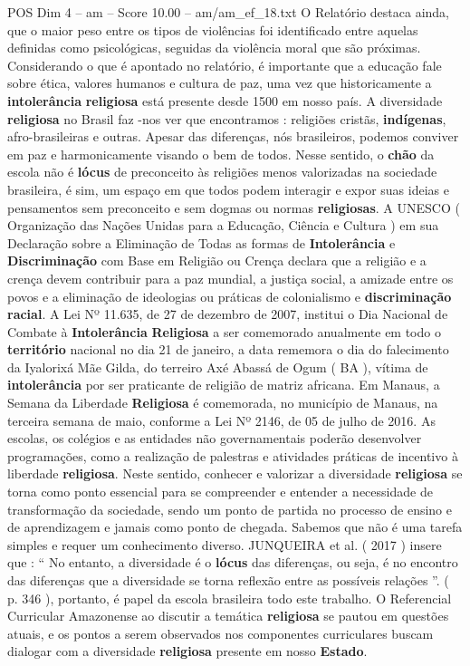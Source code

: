 \begin{textsample}{POS Dim 4 – am – Score 10.00 – am/am\_ef\_18.txt}
O Relatório destaca ainda, que o maior peso entre os tipos de violências foi identificado entre aquelas definidas como psicológicas, seguidas da violência moral que são próximas.
Considerando o que é apontado no relatório, é importante que a educação fale sobre ética, valores humanos e cultura de paz, uma vez que historicamente a \textbf{intolerância} \textbf{religiosa} está presente desde 1500 em nosso país.
A diversidade \textbf{religiosa} no Brasil faz -nos ver que encontramos : religiões cristãs, \textbf{indígenas}, afro-brasileiras e outras.
Apesar das diferenças, nós brasileiros, podemos conviver em paz e harmonicamente visando o bem de todos.
Nesse sentido, o \textbf{chão} da escola não é \textbf{lócus} de preconceito às religiões menos valorizadas na sociedade brasileira, é sim, um espaço em que todos podem interagir e expor suas ideias e pensamentos sem preconceito e sem dogmas ou normas \textbf{religiosas}.
A UNESCO ( Organização das Nações Unidas para a Educação, Ciência e Cultura ) em sua Declaração sobre a Eliminação de Todas as formas de \textbf{Intolerância} e \textbf{Discriminação} com Base em Religião ou Crença declara que a religião e a crença devem contribuir para a paz mundial, a justiça social, a amizade entre os povos e a eliminação de ideologias ou práticas de colonialismo e \textbf{discriminação} \textbf{racial}.
A Lei Nº 11.635, de 27 de dezembro de 2007, institui o Dia Nacional de Combate à \textbf{Intolerância} \textbf{Religiosa} a ser comemorado anualmente em todo o \textbf{território} nacional no dia 21 de janeiro, a data rememora o dia do falecimento da Iyalorixá Mãe Gilda, do terreiro Axé Abassá de Ogum ( BA ), vítima de \textbf{intolerância} por ser praticante de religião de matriz africana.
Em Manaus, a Semana da Liberdade \textbf{Religiosa} é comemorada, no município de Manaus, na terceira semana de maio, conforme a Lei Nº 2146, de 05 de julho de 2016.
As escolas, os colégios e as entidades não governamentais poderão desenvolver programações, como a realização de palestras e atividades práticas de incentivo à liberdade \textbf{religiosa}.
Neste sentido, conhecer e valorizar a diversidade \textbf{religiosa} se torna como ponto essencial para se compreender e entender a necessidade de transformação da sociedade, sendo um ponto de partida no processo de ensino e de aprendizagem e jamais como ponto de chegada.
Sabemos que não é uma tarefa simples e requer um conhecimento diverso.
JUNQUEIRA et al. ( 2017 ) insere que : “ No entanto, a diversidade é o \textbf{lócus} das diferenças, ou seja, é no encontro das diferenças que a diversidade se torna reflexão entre as possíveis relações ”. ( p. 346 ), portanto, é papel da escola brasileira todo este trabalho.
O Referencial Curricular Amazonense ao discutir a temática \textbf{religiosa} se pautou em questões atuais, e os pontos a serem observados nos componentes curriculares buscam dialogar com a diversidade \textbf{religiosa} presente em nosso \textbf{Estado}.

\end{textsample}
